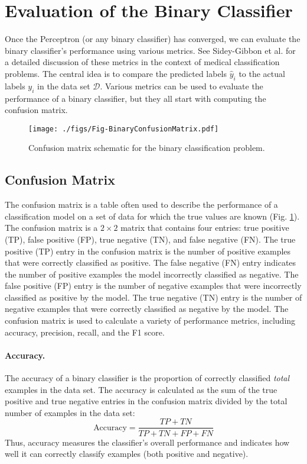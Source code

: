 \documentclass{article}[11pt]
\begin{document}
\section{Evaluation of the Binary Classifier}
Once the Perceptron (or any binary classifier) has converged, we can evaluate the binary classifier's performance using various metrics.
See Sidey-Gibbon et al. \cite{SG2019} for a detailed discussion of these metrics in the context of medical classification problems.
The central idea is to compare the predicted labels $\hat{y}_{i}$ to the actual labels $y_{i}$ in the data set $\mathcal{D}$. 
Various metrics can be used to evaluate the performance of a binary classifier, but they all start with computing the confusion matrix.

\begin{figure}
    \centering
	\texttt{[image: ./figs/Fig-BinaryConfusionMatrix.pdf]}
	\caption{Confusion matrix schematic for the binary classification problem.}\label{fig:binaryconfusionmatrx}
\end{figure}

\subsection{Confusion Matrix}
The confusion matrix is a table often used to describe the performance of a classification model on a set of data for which the true values are known (Fig. \ref{fig:binaryconfusionmatrx}).
The confusion matrix is a $2\times{2}$ matrix that contains four entries: true positive (TP), false positive (FP), true negative (TN), and false negative (FN).
The true positive (TP) entry in the confusion matrix is the number of positive examples that were correctly classified as positive.
The false negative (FN) entry indicates the number of positive examples the model incorrectly classified as negative.
The false positive (FP) entry is the number of negative examples that were incorrectly classified as positive by the model.
The true negative (TN) entry is the number of negative examples that were correctly classified as negative by the model.
The confusion matrix is used to calculate a variety of performance metrics, including accuracy, precision, recall, and the F1 score.

\paragraph*{Accuracy.}
The accuracy of a binary classifier is the proportion of correctly classified \textit{total} examples in the data set.
The accuracy is calculated as the sum of the true positive and true negative entries in the confusion matrix divided by the total number of examples in the data set:
\begin{equation}
    \text{Accuracy} = \frac{TP + TN}{TP + TN + FP + FN}
\end{equation}
Thus, accuracy measures the classifier's overall performance and indicates how well it can correctly classify examples (both positive and negative).
\end{document}
